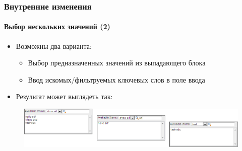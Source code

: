 \begin{frame}[fragile]
	\frametitle{Внутренние изменения}
	\framesubtitle{Выбор нескольких значений (2)}

	\begin{itemize}
		\item Возможны два варианта:

			\begin{itemize}
				\item Выбор предназначенных значений из выпадающего блока
				\item Ввод искомых/фильтруемых ключевых слов в поле ввода
			\end{itemize}

		\item Результат может выглядеть так:
	\end{itemize}

	\begin{figure}
		\includegraphics[width=1\linewidth]{Images/InDepthChanges/MultipleValueSelector.png}
	\end{figure}

\end{frame}


